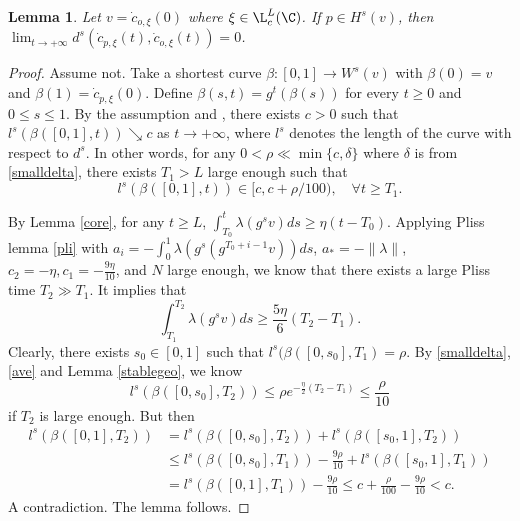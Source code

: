 \documentclass[11pt]{amsart}
\newtheorem{lemma}[theorem]{Lemma}
\theoremstyle{definition}
\def\b{\beta}
\def\d{\delta}   %
\begin{document}
\begin{lemma}\label{limitzero}
Let $v=\dot{c}_{o,\xi}(0)$ where $\xi\in \L_c^L(\C)$. If $p\in H^s(v)$, then $\lim_{t\to +\infty}d^s(\dot c_{p,\xi}(t), \dot c_{o,\xi}(t))=0$.
\end{lemma}
\begin{proof}
Assume not. Take a shortest curve $\beta: [0,1]\to W^s(v)$ with $\beta(0)=v$ and $\b(1)=\dot c_{p,\xi}(0)$. Define $\b(s,t)=g^t(\b(s))$ for every $t\ge 0$ and $0\le s\le1$. By the assumption and \cite[Lemma 2.13]{BCFT}, there exists $c>0$ such that $l^s(\b([0,1],t))\searrow c$ as $t\to +\infty$, where $l^s$ denotes the length of the curve with respect to $d^s$. In other words, for any $0<\rho\ll \min\{c,\d\}$ where $\d$ is from \eqref{smalldelta}, there exists $T_1>L$ large enough such that 
$$l^s(\b([0,1],t))\in [c, c+\rho/100), \quad \forall t\ge T_1.$$

By Lemma \ref{core}, for any $t\ge L$, $\int_{T_0}^t\lambda(g^sv)ds \ge \eta(t-T_0)$. Applying Pliss lemma \ref{pli} with 
$a_i=-\int_0^1\lambda(g^s(g^{T_0+i-1}v))ds$, $a_*= -\|\lambda\|$, $c_2=-\eta, c_1=-\frac{9\eta}{10}$, and $N$ large enough, we know that there exists a large Pliss time $T_2\gg T_1$. It implies that
\begin{equation}\label{ave}
\int_{T_1}^{T_2}\lambda(g^sv)ds \ge \frac{5\eta}{6}(T_2-T_1).
\end{equation}
Clearly, there exists $s_0\in [0,1]$ such that $l^s(\b([0,s_0],T_1)=\rho.$
By \eqref{smalldelta}, \eqref{ave} and Lemma \ref{stablegeo}, we know 
$$l^s(\b([0,s_0],T_2))\le \rho e^{-\frac{\eta}{2}(T_2-T_1)}\le \frac{\rho}{10}$$ 
if $T_2$ is large enough.
But then 
\begin{equation*}
\begin{aligned}
l^s(\b([0,1],T_2))&=  l^s(\b([0,s_0],T_2))+ l^s(\b([s_0,1],T_2))\\
&\le  l^s(\b([0,s_0],T_1))-\frac{9\rho}{10}+l^s(\b([s_0,1],T_1))\\
&=  l^s(\b([0,1],T_1))-\frac{9\rho}{10}\le c+\frac{\rho}{100}-\frac{9\rho}{10}<c.
\end{aligned}
\end{equation*}
A contradiction. The lemma follows.
\end{proof}
\end{document}
